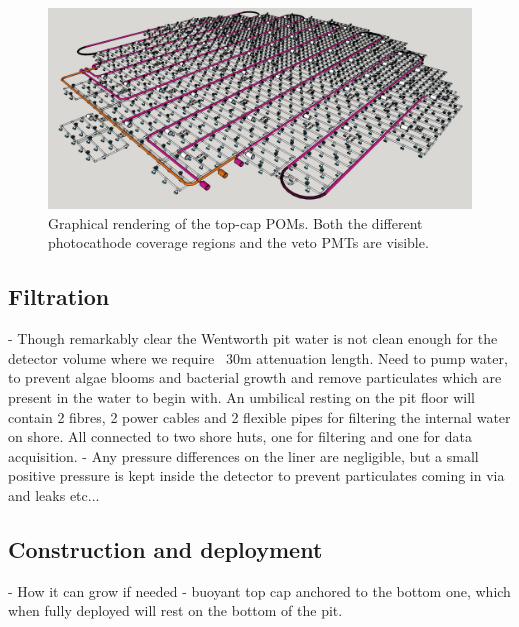 \begin{figure} %
    \includegraphics[width=\textwidth]{diagrams/4-chips/top_cap.png}
    \caption[Graphical rendering of the top-cap POMs.]
    {Graphical rendering of the top-cap POMs. Both the different photocathode coverage regions and
        the veto PMTs are visible.}
    \label{fig:top_cap}
\end{figure}

\subsection{Filtration} %
\label{sec:chips_detector_water} %

- Though remarkably clear the Wentworth pit water is not clean enough for the detector volume
where we require ~30m attenuation length. Need to pump water, to prevent algae blooms and
bacterial growth and remove particulates which are present in the water to begin with. An
umbilical resting on the pit floor will contain 2 fibres, 2 power cables and 2 flexible pipes for
filtering the internal water on shore. All connected to two shore huts, one for filtering and one
for data acquisition.
- Any pressure differences on the liner are negligible, but a small positive pressure is kept
inside the detector to prevent particulates coming in via and leaks etc...

\subsection{Construction and deployment} %
\label{sec:chips_detector_deployment} %

- How it can grow if needed - buoyant top cap anchored to the bottom one, which when fully
deployed will rest on the bottom of the pit.

